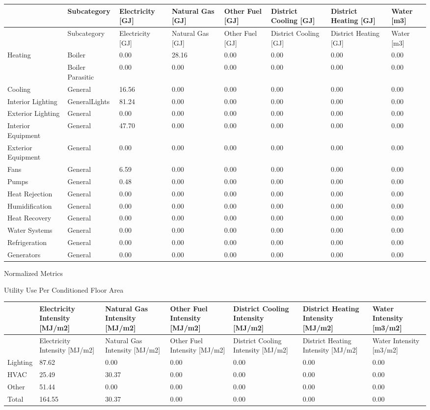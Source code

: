 {\scriptsize
\begin{longtable}[c]{>{\raggedright}p{0.75in}>{\raggedright}p{0.75in}p{0.75in}p{0.75in}p{0.75in}p{0.75in}p{0.75in}p{0.75in}}
\toprule 
~ & Subcategory & Electricity [GJ] & Natural Gas [GJ] & Other Fuel [GJ] & District Cooling [GJ] & District Heating [GJ] & Water [m3] \tabularnewline
\midrule
\endfirsthead

\toprule 
~ & Subcategory & Electricity [GJ] & Natural Gas [GJ] & Other Fuel [GJ] & District Cooling [GJ] & District Heating [GJ] & Water [m3] \tabularnewline
\midrule
\endhead

Heating & Boiler & 0.00 & 28.16 & 0.00 & 0.00 & 0.00 & 0.00 \tabularnewline
~ & Boiler Parasitic & 0.00 & 0.00 & 0.00 & 0.00 & 0.00 & 0.00 \tabularnewline
Cooling & General & 16.56 & 0.00 & 0.00 & 0.00 & 0.00 & 0.00 \tabularnewline
Interior Lighting & GeneralLights & 81.24 & 0.00 & 0.00 & 0.00 & 0.00 & 0.00 \tabularnewline
Exterior Lighting & General & 0.00 & 0.00 & 0.00 & 0.00 & 0.00 & 0.00 \tabularnewline
Interior Equipment & General & 47.70 & 0.00 & 0.00 & 0.00 & 0.00 & 0.00 \tabularnewline
Exterior Equipment & General & 0.00 & 0.00 & 0.00 & 0.00 & 0.00 & 0.00 \tabularnewline
Fans & General & 6.59 & 0.00 & 0.00 & 0.00 & 0.00 & 0.00 \tabularnewline
Pumps & General & 0.48 & 0.00 & 0.00 & 0.00 & 0.00 & 0.00 \tabularnewline
Heat Rejection & General & 0.00 & 0.00 & 0.00 & 0.00 & 0.00 & 0.00 \tabularnewline
Humidification & General & 0.00 & 0.00 & 0.00 & 0.00 & 0.00 & 0.00 \tabularnewline
Heat Recovery & General & 0.00 & 0.00 & 0.00 & 0.00 & 0.00 & 0.00 \tabularnewline
Water Systems & General & 0.00 & 0.00 & 0.00 & 0.00 & 0.00 & 0.00 \tabularnewline
Refrigeration & General & 0.00 & 0.00 & 0.00 & 0.00 & 0.00 & 0.00 \tabularnewline
Generators & General & 0.00 & 0.00 & 0.00 & 0.00 & 0.00 & 0.00 \tabularnewline
\bottomrule
\end{longtable}}

Normalized Metrics

Utility Use Per Conditioned Floor Area

\begin{longtable}[c]{>{\raggedright}p{0.85in}>{\raggedright}p{0.85in}>{\raggedright}p{0.85in}p{0.85in}p{0.85in}p{0.85in}p{0.85in}}
\toprule 
~ & Electricity Intensity [MJ/m2] & Natural Gas Intensity [MJ/m2] & Other Fuel Intensity [MJ/m2] & District Cooling Intensity [MJ/m2] & District Heating Intensity [MJ/m2] & Water Intensity [m3/m2] \tabularnewline
\midrule
\endfirsthead

\toprule 
~ & Electricity Intensity [MJ/m2] & Natural Gas Intensity [MJ/m2] & Other Fuel Intensity [MJ/m2] & District Cooling Intensity [MJ/m2] & District Heating Intensity [MJ/m2] & Water Intensity [m3/m2] \tabularnewline
\midrule
\endhead

Lighting & 87.62 & 0.00 & 0.00 & 0.00 & 0.00 & 0.00 \tabularnewline
HVAC & 25.49 & 30.37 & 0.00 & 0.00 & 0.00 & 0.00 \tabularnewline
Other & 51.44 & 0.00 & 0.00 & 0.00 & 0.00 & 0.00 \tabularnewline
Total & 164.55 & 30.37 & 0.00 & 0.00 & 0.00 & 0.00 \tabularnewline
\bottomrule
\end{longtable}

